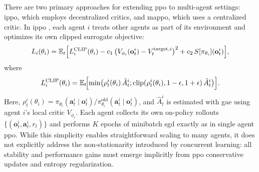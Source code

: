 \subsection{}
There are two primary approaches for extending \gls{ppo} to multi-agent settings: \gls{ippo}, which employs decentralized critics, and \gls{mappo}, which uses a centralized critic.
In \gls{ippo} \cite{witt_is_2020}, each agent \(i\) treats other agents as part of its environment and optimizes its own clipped surrogate objective:
\begin{equation}
L_i(\theta_i) = \mathbb{E}_t\Bigl[L^{\mathrm{CLIP}}_i(\theta_i) 
  - c_1\,\bigl(V_{\phi_i}(\mathbf{o}^i_t)-V^{\text{target},i}_t\bigr)^2 
  + c_2\,S[\pi_{\theta_i}](\mathbf{o}^i_t)\Bigr],
\end{equation}
where
\begin{equation}
L^{\mathrm{CLIP}}_i(\theta_i) = \mathbb{E}_t\!\Bigl[\min\bigl(\rho^i_t(\theta_i)\,\hat{A}^i_t;\text{clip}(\rho^i_t(\theta_i),1-\epsilon,1+\epsilon)\,\hat{A}^i_t\bigr)\Bigr].
\end{equation}
Here, \(\rho^i_t(\theta_i)=\pi_{\theta_i}(\mathbf{a}^i_t\mid \mathbf{o}^i_t)/\pi_{\theta_i}^{\mathrm{old}}(\mathbf{a}^i_t\mid \mathbf{o}^i_t)\), and \(\hat{A}^i_t\) is estimated with \gls{gae} using agent \(i\)'s local critic \(V_{\phi_i}\). Each agent collects its own on-policy rollouts \(\{(\mathbf{o}^i_t,\mathbf{a}^i_t,r_t)\}\) and performs \(K\) epochs of minibatch \gls{sgd} exactly as in single agent \gls{ppo}.  While this simplicity enables straightforward scaling to many agents, it does not explicitly address the non-stationarity introduced by concurrent learning: all stability and performance gains must emerge implicitly from \gls{ppo} conservative updates and entropy regularization.

